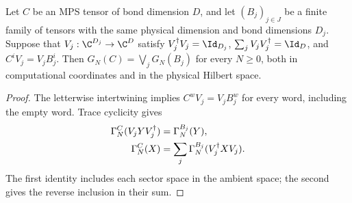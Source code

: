 \begin{lemma}
    \label{thm:isometric_sector_ground_space_resolution}
    \leanok
    Let $C$ be an MPS tensor of bond dimension $D$, and let
    $(B_j)_{j\in J}$ be a finite family of tensors with the same physical
    dimension and bond dimensions $D_j$. Suppose that
    $V_j:\C^{D_j}\to\C^D$ satisfy $V_j^\dagger V_j=\Id_{D_j}$,
    $\sum_jV_jV_j^\dagger=\Id_D$, and $C^iV_j=V_jB_j^i$.
    Then $G_N(C)=\bigvee_jG_N(B_j)$ for every $N\ge0$, both in
    computational coordinates and in the physical Hilbert space.
\end{lemma}
\begin{proof}\leanok
    The letterwise intertwining implies $C^wV_j=V_jB_j^w$ for every word,
    including the empty word. Trace cyclicity gives
    \begin{align}
        \Gamma_N^C(V_jYV_j^\dagger) & =\Gamma_N^{B_j}(Y),\notag                      \\
        \Gamma_N^C(X)               & =\sum_j\Gamma_N^{B_j}(V_j^\dagger XV_j).\notag
    \end{align}
    The first identity includes each sector space in the ambient space;
    the second gives the reverse inclusion in their sum.
\end{proof}

